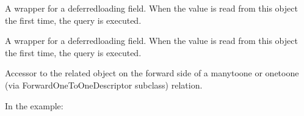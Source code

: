 \documentclass[a4paper,11pt,spanish]{sphinxmanual}
\begin{document}
\begin{fulllineitems}
\begin{fulllineitems}
\end{fulllineitems}


\begin{fulllineitems}
\label{\detokenize{api/inventory/inventory.models:inventory.models.InventoryPeriodSnapshotItem.expiry}}
\pysigstartsignatures
\pysigline
{}
\pysigstopsignatures
\sphinxAtStartPar
A wrapper for a deferred\sphinxhyphen{}loading field. When the value is read from this
object the first time, the query is executed.

\end{fulllineitems}


\begin{fulllineitems}
\label{\detokenize{api/inventory/inventory.models:inventory.models.InventoryPeriodSnapshotItem.id}}
\pysigstartsignatures
\pysigline
{}
\pysigstopsignatures
\sphinxAtStartPar
A wrapper for a deferred\sphinxhyphen{}loading field. When the value is read from this
object the first time, the query is executed.

\end{fulllineitems}


\begin{fulllineitems}
\label{\detokenize{api/inventory/inventory.models:inventory.models.InventoryPeriodSnapshotItem.id_location}}
\pysigstartsignatures
\pysigline
{}
\pysigstopsignatures
\sphinxAtStartPar
Accessor to the related object on the forward side of a many\sphinxhyphen{}to\sphinxhyphen{}one or
one\sphinxhyphen{}to\sphinxhyphen{}one (via ForwardOneToOneDescriptor subclass) relation.

\sphinxAtStartPar
In the example:

\begin{sphinxVerbatim}[commandchars=\\\{\}]
       
\end{sphinxVerbatim}


\end{fulllineitems}
\end{fulllineitems}
\end{document}
